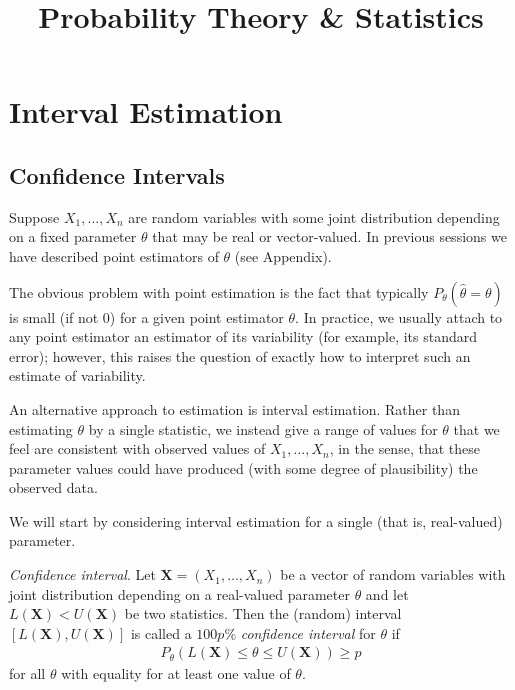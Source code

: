 \documentclass[11pt,a4paper]{article}
\title{Probability Theory \& Statistics}
\begin{document}
\maketitle
\newpage

\section{Interval Estimation}

\subsection{Confidence Intervals}

Suppose \(X_{1}, \ldots, X_{n}\) are random variables with some joint distribution 
depending on a fixed parameter \(\theta\) that may be real or vector-valued.
In previous sessions we have described point estimators of \(\theta\) (see Appendix).

The obvious problem with point estimation is the fact 
that typically \(P_{\theta}(\widehat{\theta} = \theta)\) is small (if not 0) for a given point estimator \(\theta\).
In practice, 
we usually attach to any point estimator an estimator of its variability (for example, its standard error);
however, 
this raises the question of exactly how to interpret such an estimate of variability.

An alternative approach to estimation is interval estimation.
Rather than estimating \(\theta\) by a single statistic, 
we instead give a range of values for \(\theta\) that we feel are consistent 
with observed values of \(X_{1}, \ldots, X_{n}\), 
in the sense, that these parameter values could have produced (with some degree of plausibility) the observed data.

We will start by considering interval estimation for a single (that is, real-valued) parameter.

\emph{Confidence interval}. 
Let \(\boldsymbol{X}=\left(X_{1}, \ldots, X_{n}\right)\) be a vector of random variables with
joint distribution depending on a real-valued parameter \(\theta\) and
let \(L(\boldsymbol{X}) < U(\boldsymbol{X})\) be two statistics. 
Then the (random) interval \(\left[L(\boldsymbol{X}), U(\boldsymbol{X})\right]\) is 
called a \(100p\%\) \emph{confidence interval} for \(\theta\) if
\begin{align}
P_{\theta} \left(L(\boldsymbol{X}) \leq \theta \leq U(\boldsymbol{X})\right) \geq p
\end{align}
for all \(\theta\) with equality for at least one value of \(\theta\).
\end{document}
